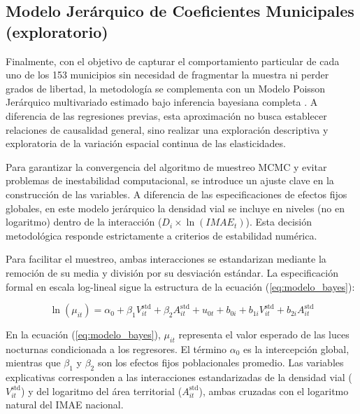 \documentclass[
  spanish,
  12pt,
  letterpaper]{article}
\begin{document}
\subsection{Modelo Jerárquico de Coeficientes Municipales
(exploratorio)}\label{modelo-jeruxe1rquico-de-coeficientes-municipales-exploratorio}

Finalmente, con el objetivo de capturar el comportamiento particular de
cada uno de los 153 municipios sin necesidad de fragmentar la muestra ni
perder grados de libertad, la metodología se complementa con un Modelo
Poisson Jerárquico multivariado estimado bajo inferencia bayesiana
completa \parencite{gelman2006data}. A diferencia de las regresiones
previas, esta aproximación no busca establecer relaciones de causalidad
general, sino realizar una exploración descriptiva y exploratoria de la
variación espacial continua de las elasticidades.

Para garantizar la convergencia del algoritmo de muestreo MCMC y evitar
problemas de inestabilidad computacional, se introduce un ajuste clave
en la construcción de las variables. A diferencia de las
especificaciones de efectos fijos globales, en este modelo jerárquico la
densidad vial se incluye en niveles (no en logaritmo) dentro de la
interacción (\(D_i \times \ln(IMAE_t)\)). Esta decisión metodológica
responde estrictamente a criterios de estabilidad numérica.

Para facilitar el muestreo, ambas interacciones se estandarizan mediante
la remoción de su media y división por su desviación estándar. La
especificación formal en escala log-lineal sigue la estructura de la
ecuación (\ref{eq:modelo_bayes}):

\begin{equation}
\label{eq:modelo_bayes}
\ln(\mu_{it}) = \alpha_0 + \beta_{1} V_{it}^{\text{std}} + \beta_{2} A_{it}^{\text{std}} + u_{0t} + b_{0i} + b_{1i} V_{it}^{\text{std}} + b_{2i} A_{it}^{\text{std}}
\end{equation}

En la ecuación (\ref{eq:modelo_bayes}), \(\mu_{it}\) representa el valor
esperado de las luces nocturnas condicionada a los regresores. El
término \(\alpha_0\) es la intercepción global, mientras que \(\beta_1\)
y \(\beta_2\) son los efectos fijos poblacionales promedio. Las
variables explicativas corresponden a las interacciones estandarizadas
de la densidad vial (\(V_{it}^{\text{std}}\)) y del logaritmo del área
territorial (\(A_{it}^{\text{std}}\)), ambas cruzadas con el logaritmo
natural del IMAE nacional.
\end{document}
